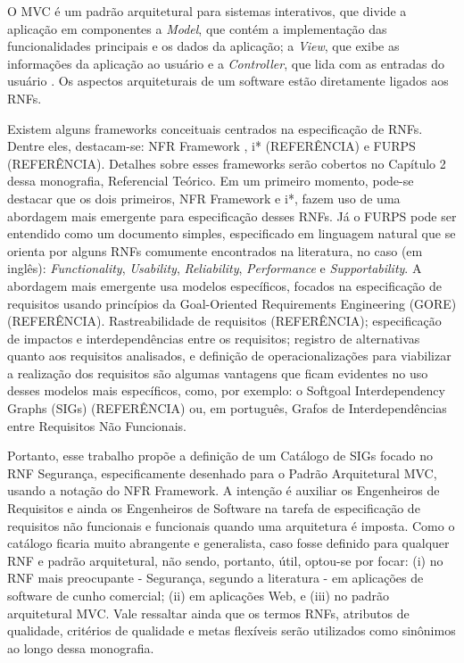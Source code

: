 O MVC é um padrão arquitetural para sistemas interativos, que divide a aplicação em componentes a \textit{Model}, que contém a implementação das funcionalidades principais e os dados da aplicação; a \textit{View}, que exibe as informações da aplicação ao usuário e a \textit{Controller}, que lida com as entradas do usuário \cite{buschmann1996system}. Os aspectos arquiteturais de um software estão diretamente ligados aos RNFs.



Existem alguns frameworks conceituais centrados na especificação de RNFs. Dentre eles, destacam-se: NFR Framework \cite{chung2009non}, i* (REFERÊNCIA) e FURPS (REFERÊNCIA). Detalhes sobre esses frameworks serão cobertos no Capítulo 2 dessa monografia, Referencial Teórico. Em um primeiro momento, pode-se destacar que os dois primeiros, NFR Framework e i*, fazem uso de uma abordagem mais emergente para especificação desses RNFs. Já o FURPS pode ser entendido como um documento simples, especificado em linguagem natural que se orienta por alguns RNFs comumente encontrados na literatura, no caso (em inglês): \textit{Functionality}, \textit{Usability}, \textit{Reliability}, \textit{Performance} e \textit{Supportability}.
A abordagem mais emergente usa modelos específicos, focados na especificação de requisitos usando princípios da Goal-Oriented Requirements Engineering (GORE) (REFERÊNCIA). Rastreabilidade de requisitos (REFERÊNCIA); especificação de impactos e interdependências entre os requisitos; registro de alternativas quanto aos requisitos analisados, e definição de operacionalizações para viabilizar a realização dos requisitos são algumas vantagens que ficam evidentes no uso desses modelos mais específicos, como, por exemplo: o Softgoal Interdependency Graphs (SIGs) (REFERÊNCIA) ou, em português, Grafos de Interdependências entre Requisitos Não Funcionais. 

Portanto, esse trabalho propõe a definição de um Catálogo de SIGs focado no RNF Segurança, especificamente desenhado para o Padrão Arquitetural MVC, usando a notação do NFR Framework. A intenção é auxiliar os Engenheiros de Requisitos e ainda os Engenheiros de Software na tarefa de especificação de requisitos não funcionais e funcionais quando uma arquitetura é imposta. Como o catálogo ficaria muito abrangente e generalista, caso fosse definido para qualquer RNF e padrão arquitetural, não sendo, portanto, útil, optou-se por focar: (i) no RNF mais preocupante - Segurança, segundo a literatura - em aplicações de software de cunho comercial; (ii) em aplicações Web, e (iii) no padrão arquitetural MVC.  Vale ressaltar ainda que os termos RNFs, atributos de qualidade, critérios de qualidade e metas flexíveis serão utilizados como sinônimos ao longo dessa monografia.


